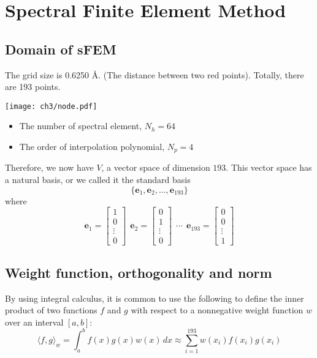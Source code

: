 \chapter{Spectral Finite Element Method}
\section{Domain of sFEM}
The grid size is 0.6250 Å. (The distance between two red points). Totally, there are 193 points.
\begin{center}
        \texttt{[image: ch3/node.pdf]}
\end{center}
\begin{itemize}
        \item The number of spectral element, $N_h=64$
        \item The order of interpolation polynomial, $N_p=4$
\end{itemize}
Therefore, we now have $V$, a vector space  of dimension $193$. This vector space has a natural basis, or we called it the standard basis
\begin{equation}
        \{\textbf{e}_1, \textbf{e}_2, ..., \textbf{e}_{193}\}
\end{equation}
where
\begin{equation}
\textbf{e}_1=  \begin{bmatrix} 1 \\ 0 \\ \vdots \\ 0 \end{bmatrix}~~
\textbf{e}_2=  \begin{bmatrix} 0 \\ 1 \\ \vdots \\ 0 \end{bmatrix}~~
\cdots ~~
\textbf{e}_{193} = \begin{bmatrix} 0 \\ 0 \\ \vdots \\ 1 \end{bmatrix} 
\end{equation}

\section{Weight function, orthogonality and norm}
\begin{definition}
By using integral calculus, it is common to use the following to define the inner product of two functions $f$ and $g$ with respect to a nonnegative weight function $w$ over an interval $[a, b]$:
\begin{equation}
        \langle f, g\rangle_w = \int_a^b f(x)g(x)w(x)\,dx \approx \sum_{i=1}^{193}w(x_i)f(x_i)g(x_i) 
\end{equation}
\end{definition}

